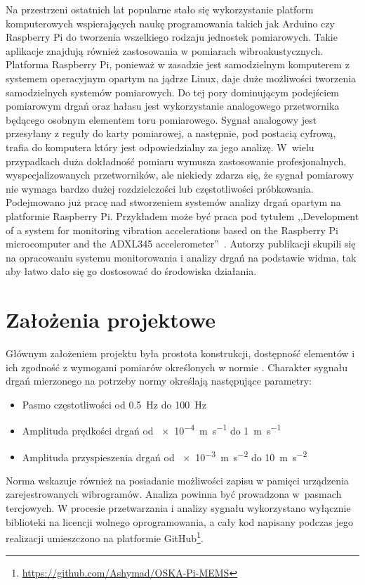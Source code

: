 \documentclass[a4paper,12pt]{mwart}
\let\Oldsection\section
\renewcommand{\section}{\FloatBarrier\Oldsection}
\begin{document}
Na przestrzeni ostatnich lat popularne stało się wykorzystanie platform
komputerowych wspierających naukę programowania takich jak Arduino czy Raspberry
Pi do tworzenia wszelkiego rodzaju jednostek pomiarowych. Takie aplikacje
znajdują również zastosowania w pomiarach wibroakustycznych. Platforma Raspberry
Pi, ponieważ w zasadzie jest samodzielnym komputerem z systemem operacyjnym
opartym na jądrze Linux, daje duże możliwości tworzenia samodzielnych systemów
pomiarowych. Do tej pory dominującym podejściem pomiarowym drgań oraz hałasu
jest wykorzystanie analogowego przetwornika będącego osobnym elementem toru
pomiarowego. Sygnał analogowy jest przesyłany z reguły do karty pomiarowej, a
następnie, pod postacią cyfrową, trafia do komputera który jest odpowiedzialny
za jego analizę. W~wielu przypadkach duża dokładność pomiaru wymusza
zastosowanie profesjonalnych, wyspecjalizowanych przetworników, ale niekiedy
zdarza się, że sygnał pomiarowy nie wymaga bardzo dużej rozdzielczości lub
częstotliwości próbkowania. Podejmowano już pracę nad stworzeniem systemów
analizy drgań opartym na platformie Raspberry Pi. Przykładem może być praca pod
tytułem ,,Development of a system for monitoring vibration accelerations based
on the Raspberry Pi microcomputer and the ADXL345 accelerometer''~\cite{art1}.
Autorzy publikacji skupili się na opracowaniu systemu monitorowania i analizy
drgań na podstawie widma, tak aby łatwo dało się go dostosować do środowiska
działania. 

\section{Założenia projektowe}

Głównym założeniem projektu była prostota konstrukcji, dostępność elementów i
ich zgodność z wymogami pomiarów określonych w normie \cite{norma}. Charakter
sygnału drgań mierzonego na potrzeby normy określają następujące parametry:
\begin{itemize}
  \item Pasmo częstotliwości od \SI{0,5}{\hertz} do \SI{100}{\hertz}
  \item Amplituda prędkości drgań od \SI{e-4}{\metre\per\second} do \SI{1}{\metre\per\second}
  \item Amplituda przyspieszenia drgań od \SI{e-3}{\metre\per\square\second} do \SI{10}{\metre\per\square\second}
\end{itemize}
Norma wskazuje również na posiadanie możliwości zapisu w pamięci urządzenia
zarejestrowanych wibrogramów. Analiza powinna być prowadzona w~pasmach
tercjowych. W procesie przetwarzania i analizy sygnału wykorzystano wyłącznie
biblioteki na licencji wolnego oprogramowania, a cały kod napisany podczas jego
realizacji umieszczono na platformie
GitHub\footnote{\url{https://github.com/Ashymad/OSKA-Pi-MEMS}}.
\end{document}
